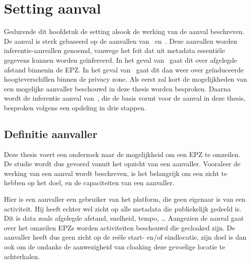 
\chapter{Setting aanval}\label{sec:inferentieaanval}
Gedurende dit hoofdstuk de setting alsook de werking van de aanval beschreven.
De aanval is sterk gebaseerd op de aanvallen
van~\citeauthor{Dhondt_Pochat_Voulimeneas_Joosen_Volckaert_2022}\cite{Dhondt_Pochat_Voulimeneas_Joosen_Volckaert_2022}
en~\citeauthor{Verdonck_2022}\cite{Verdonck_2022}. Deze aanvallen worden
inferentie-aanvallen genoemd, vanwege het feit dat uit metadata essentiële
gegevens kunnen worden geïnfereerd. In het geval
van~\citeauthor{Dhondt_Pochat_Voulimeneas_Joosen_Volckaert_2022} gaat dit over
afgelegde afstand binnenin de \ac{EPZ}. In het geval
van~\citeauthor{Verdonck_2022} gaat dit dan weer over geïnduceerde
hoogteverschillen binnen de privacy zone. Als eerst zal kort de mogelijkheden
van een mogelijke aanvaller beschouwd in deze thesis worden besproken. Daarna
wordt de inferentie aanval
van~\citeauthor{Dhondt_Pochat_Voulimeneas_Joosen_Volckaert_2022}, die de basis
vormt voor de aanval in deze thesis, besproken volgens een opdeling in drie
stappen.

\section{Definitie aanvaller}
Deze thesis voert een onderzoek naar de mogelijkheid om een \ac{EPZ} te
omzeilen. De studie wordt dus gevoerd vanuit het opzicht van een aanvaller.
Vooraleer de werking van een aanval wordt beschreven, is het belangrijk om een
zicht te hebben op het doel, en de capaciteiten van een aanvaller.

Hier is een aanvaller een gebruiker van het platform, die geen eigenaar is van
een activiteit. Hij heeft echter wel zicht op alle metadata die publiekelijk
gedeeld is. Dit is data zoals afgelegde afstand, snelheid, tempo, \ldots
Aangezien de aanval gaat over het omzeilen \acp{EPZ} worden activiteiten
beschouwd die gecloaked zijn. De aanvaller heeft dus geen zicht op de reële
start- en/of eindlocatie, zijn doel is dan ook om de ondanks de aanwezigheid
van cloaking deze gevoelige locatie te achterhalen.

